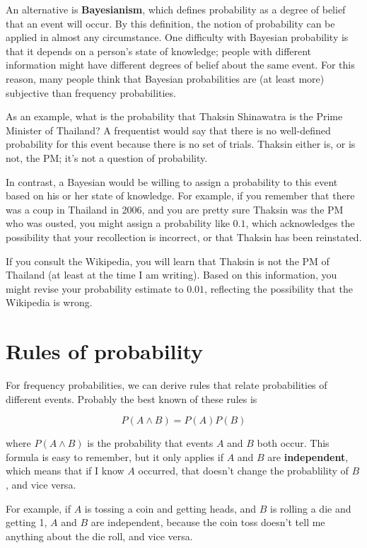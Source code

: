 \documentclass[12pt]{book}
\begin{document}
An alternative is {\bf Bayesianism}, which defines probability as
a degree of belief that an event will occur.  By this definition,
the notion of probability can be applied in almost any circumstance.
One difficulty with Bayesian probability is that it depends on
a person's state of knowledge; people with different information
might have different degrees of belief about the same event.  For
this reason, many people think that Bayesian probabilities are
(at least more) subjective than frequency probabilities.

As an example, what is the probability that Thaksin Shinawatra is the
Prime Minister of Thailand?  A frequentist would say that there is no
well-defined probability for this event because there is no set of
trials.  Thaksin either is, or is not, the PM; it's not a question of
probability.

In contrast, a Bayesian would be willing to assign a probability to
this event based on his or her state of knowledge.  For example, if
you remember that there was a coup in Thailand in 2006, and you are
pretty sure Thaksin was the PM who was ousted, you might
assign a probability like $0.1$, which acknowledges the possibility
that your recollection is incorrect, or that Thaksin has been
reinstated.

If you consult the Wikipedia, you will learn that Thaksin is not the
PM of Thailand (at least at the time I am writing).  Based on this
information, you might revise your probability estimate to $0.01$,
reflecting the possibility that the Wikipedia is wrong.


\section{Rules of probability}

For frequency probabilities, we can derive rules that relate
probabilities of different events.  Probably the best known of these
rules is

\renewcommand{\and}{\wedge}

\[ P(A \and B) = P(A) P(B) \]

where $P(A \and B)$ is the probability that events $A$ and $B$ both
occur.  This formula is easy to remember, but it only applies if $A$
and $B$ are {\bf independent}, which means that if I know $A$
occurred, that doesn't change the probablility of $B$, and vice versa.

For example, if $A$ is tossing a coin and getting heads, and $B$
is rolling a die and getting 1, $A$ and $B$ are independent, because
the coin toss doesn't tell me anything about the die roll, and vice
versa.
\end{document}
